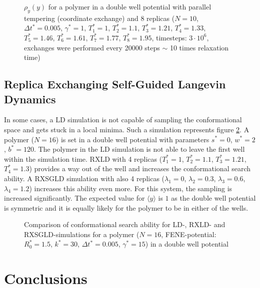 \documentclass[a4paper]{article}
\begin{document}
\begin{figure} [H]
\centering
\scalebox{.9}{}
\caption{$\rho_y(y)$ for a polymer in a double well potential with parallel tempering (coordinate exchange) and 8 replicas ($N = 10$, $\Delta t^* = 0.005$, $\gamma^* = 1$, $T_1^* = 1$, $T_2^* = 1.1$, $T_3^* = 1.21$, $T_4^* = 1.33$, $T_5^* = 1.46$, $T_6^* = 1.61$, $T_7^* = 1.77$, $T_8^* = 1.95$, timesteps: $3 \cdot 10^6$, exchanges were performed every 20000 steps $\sim$ 10 times relaxation time)}
\label{im:with_tempering_8}
\end{figure}

\subsection{Replica Exchanging Self-Guided Langevin Dynamics}

In some cases, a LD simulation is not capable of sampling the conformational space and gets stuck in a local minima. Such a simulation represents figure \ref{im:comparison_rxld_rxsgld}. A polymer ($N = 16$) is set in a double well potential with parameters $s^* = 0$, $w^* = 2$, $b^* = 120$. The polymer in the LD simulation is not able to leave the first well within the simulation time. RXLD with 4 replicas ($T_1^* = 1$, $T_2^* = 1.1$, $T_3^* = 1.21$, $T_4^* = 1.3$) provides a way out of the well and increases the conformational search ability. A RXSGLD simulation with also 4 replicas ($\lambda_1 = 0$, $\lambda_2 = 0.3$, $\lambda_3 = 0.6$, $\lambda_4 = 1.2$) increases this ability even more. For this system, the sampling is increased significantly. The expected value for $\langle y \rangle$ is $1$ as the double well potential is symmetric and it is equally likely for the polymer to be in either of the wells.

\begin{figure} [H]
\centering

\caption{Comparison of conformational search ability for LD-, RXLD- and RXSGLD-simulations for a polymer ($N = 16$, FENE-potential: $R_0^* = 1.5$, $k^* = 30$, $\Delta t^* = 0.005$, $\gamma^* = 15$) in a double well potential}
\label{im:comparison_rxld_rxsgld}
\end{figure}

\section{Conclusions}
\end{document}
